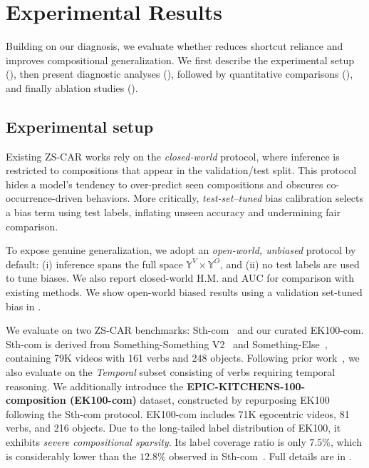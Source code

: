 \section{Experimental Results}
\label{sec:results}


Building on our diagnosis, we evaluate whether \ours{} reduces shortcut reliance and improves compositional generalization.
We first describe the experimental setup (), then present diagnostic analyses (), followed by quantitative comparisons (), and finally ablation studies ().


\subsection{Experimental setup}
\label{sec:exp_setup}

Existing ZS-CAR works \cite{li2024c2c, jiang2025dhd, jung2025crr} rely on the \emph{closed-world} protocol, where inference is restricted to compositions that appear in the validation/test split.  
This protocol hides a model’s tendency to over-predict seen compositions and obscures co-occurrence-driven behaviors.
More critically, \emph{test-set–tuned} bias calibration selects a bias term using test labels, inflating unseen accuracy and undermining fair comparison.

To expose genuine generalization, we adopt an \emph{open-world, unbiased} protocol by default:
(i) inference spans the full space $\mathbb{Y}^V \times \mathbb{Y}^O$, and  
(ii) no test labels are used to tune biases.  
We also report closed-world H.M. and AUC for comparison with existing methods.
We show open-world biased results using a validation set-tuned bias in .



We evaluate on two ZS-CAR benchmarks: Sth-com~\cite{li2024c2c} and our curated EK100-com.  
Sth-com is derived from Something-Something V2~\cite{goyal2017something} and Something-Else~\cite{mat2020sthelse},  
containing 79K videos with 161 verbs and 248 objects.  
Following prior work~\cite{yun2022time,laura2021temporal}, we also evaluate on the \emph{Temporal} subset consisting of verbs requiring temporal reasoning.
We additionally introduce the \textbf{EPIC-KITCHENS-100-composition (EK100-com)} dataset, constructed by repurposing EK100~\cite{damen2022ek100} following the Sth-com protocol.  
EK100-com includes 71K egocentric videos, 81 verbs, and 216 objects.  
Due to the long-tailed label distribution of EK100, it exhibits \emph{severe compositional sparsity}.
Its label coverage ratio
is only $7.5\%$, which is considerably lower than the $12.8\%$ observed in Sth-com~\cite{li2024c2c}.
Full details are in .


